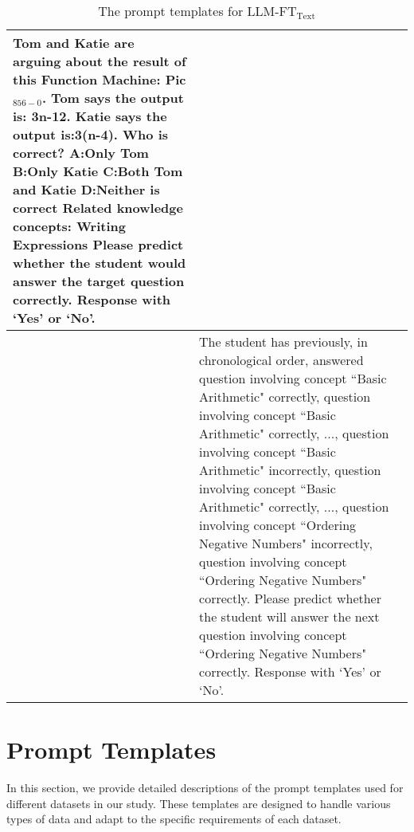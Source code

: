 \begin{table*}[hbt!]
\begin{tabular}{| >{\centering\arraybackslash}m{} | >{\raggedright\arraybackslash}m{} |}
    Tom and Katie are arguing about the result of this Function Machine: Pic$_{856-0}$. Tom says the output is: 3n-12. Katie says the output is:3(n-4). Who is correct? \newline
    A:Only Tom B:Only Katie C:Both Tom and Katie  D:Neither is correct \newline
    Related knowledge concepts: Writing Expressions \newline
    Please predict whether the student would answer the target question correctly. Response with `Yes' or `No'. \\
\hline
5 & The student has previously, in chronological order, answered question involving concept ``Basic Arithmetic" correctly, question involving concept ``Basic Arithmetic" correctly, ..., question involving concept ``Basic Arithmetic" incorrectly, question involving concept ``Basic Arithmetic" correctly, ..., question involving concept ``Ordering Negative Numbers" incorrectly, question involving concept ``Ordering Negative Numbers" correctly. Please predict whether the student will answer the next question involving concept ``Ordering Negative Numbers" correctly. Response with `Yes' or `No'. \\
\hline
\end{tabular}
\caption{The prompt templates for LLM-FT$_\mathrm{Text}$}
\label{table:llm-kt-text-templates}
\end{table*}



\section{Prompt Templates}

In this section, we provide detailed descriptions of the prompt templates used for different datasets in our study. These templates are designed to handle various types of data and adapt to the specific requirements of each dataset. 

